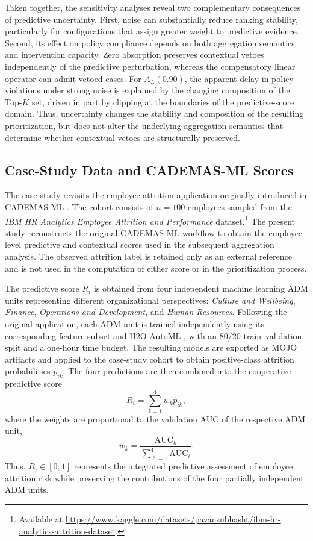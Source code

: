 \documentclass[mathematics,article,submit,moreauthors]{Definitions/mdpi}
\begin{document}
Taken together, the sensitivity analyses reveal two complementary
consequences of predictive uncertainty. First, noise can substantially
reduce ranking stability, particularly for configurations that assign
greater weight to predictive evidence. Second, its effect on policy
compliance depends on both aggregation semantics and intervention
capacity. Zero absorption preserves contextual vetoes independently of
the predictive perturbation, whereas the compensatory linear operator can
admit vetoed cases. For $A_L(0.90)$, the apparent delay in policy
violations under strong noise is explained by the changing composition of
the Top-$K$ set, driven in part by clipping at the boundaries of the
predictive-score domain. Thus, uncertainty changes the stability and
composition of the resulting prioritization, but does not alter the
underlying aggregation semantics that determine whether contextual
vetoes are structurally preserved.


\subsection{Case-Study Data and CADEMAS-ML Scores}
\label{sec:case-study-data-cademas-ml-scores}

The case study revisits the employee-attrition application originally
introduced in CADEMAS-ML \citep{Godz2026}. The cohort consists of $n=100$
employees sampled from the \textit{IBM HR Analytics Employee Attrition and
Performance} dataset.\footnote{Available at
\url{https://www.kaggle.com/datasets/pavansubhasht/ibm-hr-analytics-attrition-dataset}.}
The present study reconstructs the original CADEMAS-ML workflow to obtain
the employee-level predictive and contextual scores used in the subsequent
aggregation analysis. The observed attrition label is retained only as an
external reference and is not used in the computation of either score or in
the prioritization process.

The predictive score $R_i$ is obtained from four independent machine
learning ADM units representing different organizational perspectives:
\textit{Culture and Wellbeing}, \textit{Finance}, \textit{Operations and
Development}, and \textit{Human Resources}. Following the original
application, each ADM unit is trained independently using its corresponding
feature subset and H2O AutoML \citep{H2O.ai2026}, with an 80/20
train--validation split and a one-hour time budget. The resulting models are
exported as MOJO artifacts and applied to the case-study cohort to obtain
positive-class attrition probabilities $\hat{p}_{ik}$. The four predictions
are then combined into the cooperative predictive score
\begin{equation}
R_i = \sum_{k=1}^{4} w_k \hat{p}_{ik},
\end{equation}
where the weights are proportional to the validation AUC of the respective
ADM unit,
\begin{equation}
w_k =
\frac{\mathrm{AUC}_k}
{\sum_{\ell=1}^{4}\mathrm{AUC}_\ell}.
\end{equation}
Thus, $R_i\in[0,1]$ represents the integrated predictive assessment of
employee attrition risk while preserving the contributions of the four
partially independent ADM units.
\end{document}
